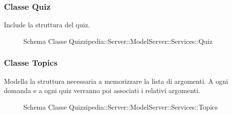 \subsubsection{Classe Quiz}
Include la struttura del quiz.
\begin{figure}[H]
\centering
\noindent{}
\caption[Schema Classe Quiz]{Schema Classe Quizzipedia::Server::ModelServer::Services::Quiz}
\end{figure}
\subsubsection{Classe Topics}
Modella la struttura necessaria a memorizzare la lista di argomenti. A ogni domanda e a ogni quiz verranno poi associati i relativi argomenti.
\begin{figure}[H]
\centering
\noindent{}
\caption[Schema Classe Topics]{Schema Classe Quizzipedia::Server::ModelServer::Services::Topics}
\end{figure}
